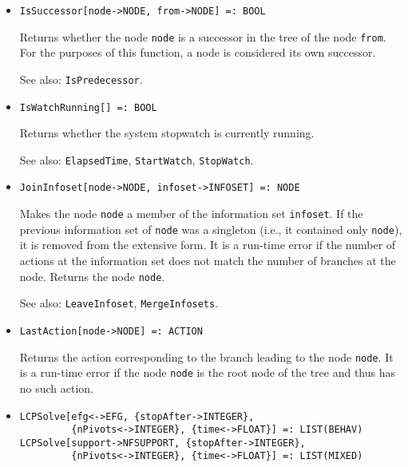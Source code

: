 \begin{itemize}
\item
\protect \large \begin{verbatim}
IsSuccessor[node->NODE, from->NODE] =: BOOL
\end{verbatim}\normalsize

\bd
Returns whether the node \verb+node+ is a successor
in the tree of the node \verb+from+.  For the purposes of this function,
a node is considered its own successor.
\item
[See also:] {\tt IsPredecessor}.
\ed

\item
\protect \large \begin{verbatim}
IsWatchRunning[] =: BOOL
\end{verbatim}\normalsize

\bd
Returns whether the system stopwatch is currently running.
\item
[See also:] {\tt ElapsedTime}, {\tt StartWatch}, {\tt StopWatch}.
\ed


\item
\protect \large \begin{verbatim}
JoinInfoset[node->NODE, infoset->INFOSET] =: NODE
\end{verbatim}\normalsize

\bd
Makes the node \verb+node+ a member of the information set
\verb+infoset+.  If the previous information set of \verb+node+ was
a singleton (i.e., it contained only \verb+node+), it is removed from the
extensive form.  It is a run-time error if the number of actions at the
information set does not match the number of branches at the node.
Returns the node \verb+node+.
\item
[See also:] {\tt LeaveInfoset}, {\tt MergeInfosets}.
\ed



\item
\protect \large \begin{verbatim} 
LastAction[node->NODE] =: ACTION
\end{verbatim}\normalsize

\bd
Returns the action corresponding to the branch leading to
the node \verb+node+.  It is a run-time error if the node \verb+node+ is
the root node of the tree and thus has no such action.
\ed

\item
\protect \large \begin{verbatim}
LCPSolve[efg<->EFG, {stopAfter->INTEGER},
         {nPivots<->INTEGER}, {time<->FLOAT}] =: LIST(BEHAV)
LCPSolve[support->NFSUPPORT, {stopAfter->INTEGER},
         {nPivots<->INTEGER}, {time<->FLOAT}] =: LIST(MIXED)
\end{verbatim}\normalsize


\end{itemize}
